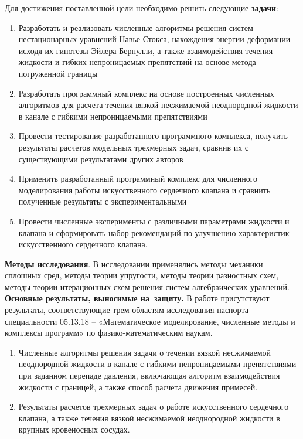 Для достижения поставленной цели необходимо решить следующие \textbf{задачи}:
\begin{enumerate}
 \item Разработать и реализовать численные алгоритмы решения систем нестационарных
     уравнений Навье-Стокса, нахождения энергии деформации исходя их гипотезы Эйлера-Бернулли,
     а также взаимодействия течения жидкости и гибких непроницаемых препятствий
     на основе метода погруженной границы
 \item Разработать программный комплекс на основе построенных численных алгоритмов
     для расчета течения вязкой несжимаемой неоднородной жидкости в канале
     с гибкими непроницаемыми препятствиями
 \item Провести тестирование разработанного программного комплекса, получить
     результаты расчетов модельных трехмерных задач, сравнив их с существующими
     результатами других авторов
 \item Применить разработанный программный комплекс для численного моделирования
     работы искусственного сердечного клапана и сравнить полученные результаты
     с экспериментальными
 \item Провести численные эксперименты с различными параметрами жидкости и клапана
     и сформировать набор рекомендаций по улучшению характеристик искусственного сердечного клапана.
\end{enumerate}

\textbf{Методы исследования}.
В исследовании применялись методы механики сплошных сред, методы теории
упругости, методы теории разностных схем, методы теории итерационных схем
решения систем алгебраических уравнений.\\

\textbf{Основные результаты, выносимые на~защиту.}
В работе присутствуют результаты, соответствующие трем областям исследования
паспорта специальности 05.13.18 – «Математическое моделирование, численные
методы и комплексы программ» по физико-математическим наукам.

\begin{enumerate}
    \item Численные алгоритмы решения задачи о течении вязкой несжимаемой
        неоднородной жидкости в канале с гибкими непроницаемыми препятствиями при
        заданном перепаде давления, включающая алгоритм взаимодействия жидкости с
        границей, а также способ расчета движения примесей.
    \item Результаты расчетов трехмерных задач о работе искусственного сердечного
        клапана, а также течения вязкой несжимаемой неоднородной жидкости в
        крупных кровеносных сосудах.
\end{enumerate}

